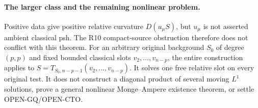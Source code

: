 \paragraph{The larger class and the remaining nonlinear problem.}
Positive data give positive relative curvature $D(u_\mu S)$,
but $u_\mu$ is not asserted ambient classical psh.  The R10
compact-source obstruction therefore does not conflict with
this theorem.  For an arbitrary original background $S_0$
of degree $(p,p)$ and fixed bounded classical slots
$v_2,\ldots,v_{n-p}$, the entire construction applies to
$S=T_{S_0,n-p-1}(v_2,\ldots,v_{n-p})$.  It solves one free
relative slot on every original test.  It does not construct
a diagonal product of several moving $L^1$ solutions, prove a
general nonlinear Monge--Ampere existence theorem, or settle
OPEN-GQ/OPEN-CTO.
